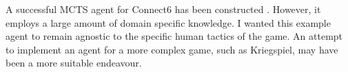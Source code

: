 A successful {MCTS} agent for {Connect6} has been constructed \cite{connect6}. However, it employs a large amount of domain specific knowledge. I wanted this example agent to remain agnostic to the specific human tactics of the game. An attempt to implement an agent for a more complex game, such as Kriegspiel, may have been a more suitable endeavour.


